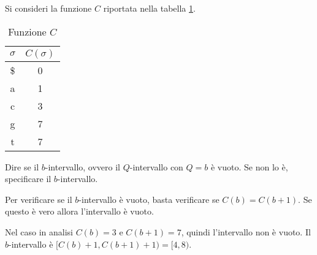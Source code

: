 \begin{esempio}
    Si consideri la funzione $C$ riportata nella tabella \ref{tab:esempioC}.
    \begin{table}[!ht]
        \centering
        \begin{tabular}{|c|c|}
            \hline
            \rowcolor[HTML]{EFEFEF}
            \textbf{$\sigma$} & \textbf{$C(\sigma)$} \\ \hline
            \$                & 0                    \\ \hline
            a                 & 1                    \\ \hline
            c                 & 3                    \\ \hline
            g                 & 7                    \\ \hline
            t                 & 7                    \\ \hline
        \end{tabular}
        \caption{Funzione $C$}
        \label{tab:esempioC}
    \end{table}
    Dire se il $b$-intervallo, ovvero il $Q$-intervallo con $Q = b$ è vuoto. Se
    non lo è, specificare il $b$-intervallo.

    Per verificare se il $b$-intervallo è vuoto, basta verificare se $C(b) =
        C(b + 1)$. Se questo è vero allora l'intervallo è vuoto.

    Nel caso in analisi $C(b) = 3$ e $C(b + 1) = 7$, quindi l'intervallo non è
    vuoto. Il $b$-intervallo è $[C(b) + 1, C(b + 1) + 1) = [4, 8)$.
\end{esempio}

